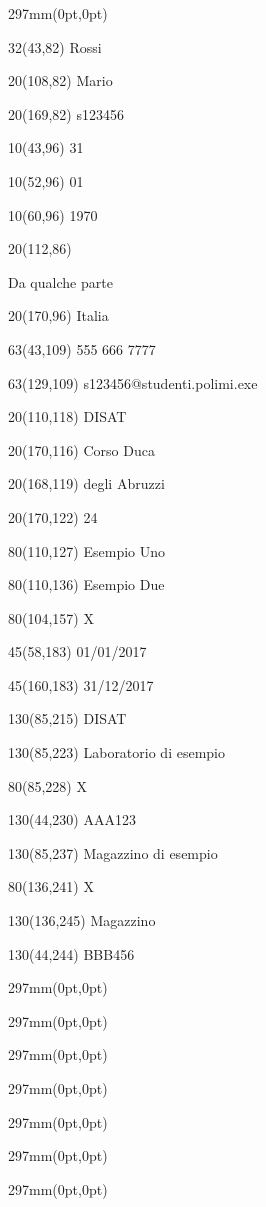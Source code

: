 \documentclass[a4paper]{article}
\newcommand{\text}[4]{\begin{textblock}{#3}(#2,#1)
{\large #4}
\end{textblock}}
\newcommand{\insertpage}[1]{\begin{textblock*}{297mm}(0pt,0pt)%
	\end{textblock*}%
}
\begin{document}
	\insertpage{1}
	\text{82}{43}{32}{Rossi} %
	\text{82}{108}{20}{Mario} %
	\text{82}{169}{20}{s123456} %
	\text{96}{43}{10}{31} %
	\text{96}{52}{10}{01} %
	\text{96}{60}{10}{1970} %
	\text{86}{112}{20}{\begin{flushright}Da qualche parte\end{flushright} %
	}
	\text{96}{170}{20}{Italia} %
	\text{109}{43}{63}{555 666 7777} %
	\text{109}{129}{63}{s123456@studenti.polimi.exe} %
	
	\text{118}{110}{20}{DISAT} %
	\text{116}{170}{20}{\small Corso Duca} %
	\text{119}{168}{20}{\small degli Abruzzi}
	\text{122}{170}{20}{\small 24}
	\text{127}{110}{80}{Esempio Uno} %
	\text{136}{110}{80}{Esempio Due} %

	\text{157}{104}{80}{\Large X} %
	\text{183}{58}{45}{01/01/2017} %
	\text{183}{160}{45}{31/12/2017} %
	
	\text{215}{85}{130}{DISAT} %
	
	\text{223}{85}{130}{Laboratorio di esempio} %
	\text{228}{85}{80}{\Large X} %
	\text{230}{44}{130}{AAA123} %
	
	\text{237}{85}{130}{Magazzino di esempio} %
	\text{241}{136}{80}{\Large X} %
	\text{245}{136}{130}{Magazzino} %
	\text{244}{44}{130}{BBB456} %
	
	\newpage
	\insertpage{2}
	
	\newpage
	\insertpage{3}
	
	\newpage
	\insertpage{4}
	
	\newpage
	\insertpage{5}
	
	\newpage
	\insertpage{6}
	
	\newpage
	\insertpage{7}
	
	\newpage
	\insertpage{8}
\end{document}
